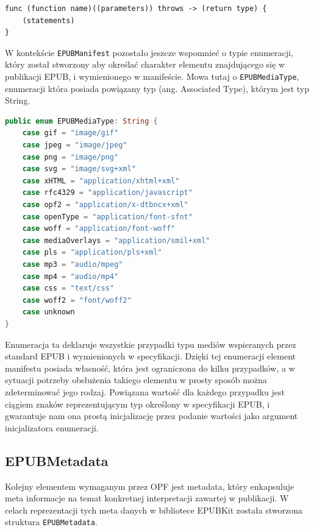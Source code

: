 \begin{lstlisting}[caption={Funkcje i metody które mogą rzucać błędy, przy deklaracji muszą zostać oznaczone słowem kluczowym \texttt{throws}\cite{theSwiftProgrammingLanguageDeclarations}},language=swift-reference,label=erty]
func (function name)((parameters)) throws -> (return type) {
    (statements)
}
\end{lstlisting}

W kontekście \texttt{EPUBManifest} pozostało jeszcze wspomnieć o typie enumeracji, który został stworzony aby określać charakter elementu znajdującego się w publikacji EPUB, i wymienionego w manifeście. Mowa tutaj o \texttt{EPUBMediaType}, enumeracji która posiada powiązany typ (ang. Associated Type), którym jest typ String.

\begin{lstlisting}[caption={Enumeracja EPUBMediaType.}, language=swift]
public enum EPUBMediaType: String {
    case gif = "image/gif"
    case jpeg = "image/jpeg"
    case png = "image/png"
    case svg = "image/svg+xml"
    case xHTML = "application/xhtml+xml"
    case rfc4329 = "application/javascript"
    case opf2 = "application/x-dtbncx+xml"
    case openType = "application/font-sfnt"
    case woff = "application/font-woff"
    case mediaOverlays = "application/smil+xml"
    case pls = "application/pls+xml"
    case mp3 = "audio/mpeg"
    case mp4 = "audio/mp4"
    case css = "text/css"
    case woff2 = "font/woff2"
    case unknown
}
\end{lstlisting}

Enumeracja ta deklaruje wszystkie przypadki typu mediów wspieranych przez standard EPUB i wymienionych w specyfikacji. Dzięki tej enumeracji element manifestu posiada własność, która jest ograniczona do kilku przypadków, a w sytuacji potrzeby obsłużenia takiego elementu w prosty sposób można zdeterminować jego rodzaj. Powiązana wartość dla każdego przypadku jest ciągiem znaków reprezentującym typ określony w specyfikacji EPUB, i gwarantuje nam ona prostą inicjalizację przez podanie wartości jako argument inicjalizatora enumeracji.

\subsection{EPUBMetadata}

Kolejny elementem wymaganym przez OPF jest metadata, który enkapsuluje meta informacje na temat konkretnej interpretacji zawartej w publikacji. W celach reprezentacji tych meta danych w bibliotece EPUBKit została stworzona struktura \texttt{EPUBMetadata}.

